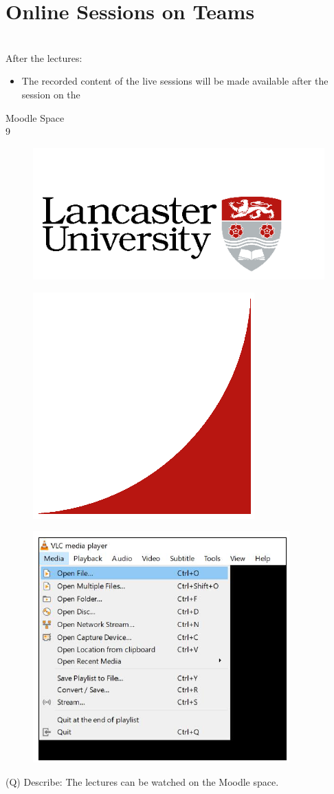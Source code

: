 \documentclass[12pt]{article}
\begin{document}
\section{Online Sessions on Teams}
\\
After the lectures:\\
\begin{itemize}
  \item The recorded content of the live sessions will be made available after the session on the 
\end{itemize}
Moodle Space\\
9\\
\begin{figure}[H]
\includegraphics[width=0.5\linewidth]{page1-image-1.png}
\end{figure}
\begin{figure}[H]
\includegraphics[width=0.5\linewidth]{page1-image-2.png}
\end{figure}
\begin{figure}[H]
\includegraphics[width=0.5\linewidth]{page1-image-3.png}
\end{figure}
\clearpage
(Q)
Describe: The lectures can be watched on the Moodle space.
\clearpage
\end{document}
